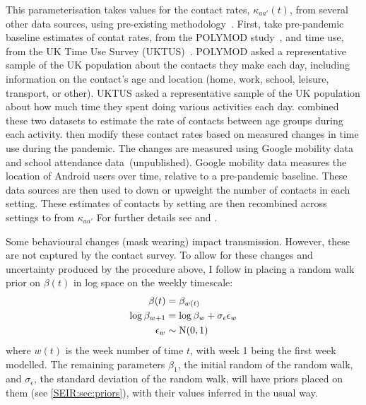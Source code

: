 \documentclass[thesis.tex]{subfiles}
\begin{document}
This parameterisation takes values for the contact rates, $\kappa_{aa'}(t)$, from several other data sources, using pre-existing methodology~\autocites{vanleeuwenTime}{vanleeuwenAugmenting}.
First, take pre-pandemic baseline estimates of contat rates, from the POLYMOD study~\autocite{mossongSocial}, and time use, from the UK Time Use Survey (UKTUS)~\autocite{UKTUS}.
POLYMOD asked a representative sample of the UK population about the contacts they make each day, including information on the contact's age and location (home, work, school, leisure, transport, or other).
UKTUS asked a representative sample of the UK population about how much time they spent doing various activities each day.
\Textcite{vanleeuwenAugmenting} combined these two datasets to estimate the rate of contacts between age groups during each activity.
\Textcite{birrellRealtime} then modify these contact rates based on measured changes in time use during the pandemic.
The changes are measured using Google mobility data~\autocite{googleCOVID19} and school attendance data~(unpublished).
Google mobility data measures the location of Android users over time, relative to a pre-pandemic baseline.
These data sources are then used to down or upweight the number of contacts in each setting.
These estimates of contacts by setting are then recombined across settings to from $\kappa_{aa'}$
For further details see \textcite{vanleeuwenAugmenting} and \textcite[supplementary material]{birrellRealtime}.

Some behavioural changes (\eg mask wearing) impact transmission.
However, these are not captured by the contact survey.
To allow for these changes and uncertainty produced by the procedure above, I follow \textcite{birrellRealtime} in placing a random walk prior on $\beta(t)$ in log space on the weekly timescale:
\begin{align}
    \beta(t) &= \beta_{w(t)} \\
    \log\beta_{w+1} &= \log\beta_w + \sigma_\epsilon \epsilon_w \\
    \epsilon_w &\sim \operatorname{N}(0, 1)
\end{align}
where $w(t)$ is the week number of time $t$, with week 1 being the first week modelled.
The remaining parameters $\beta_1$, the initial random of the random walk, and $\sigma_\epsilon$, the standard deviation of the random walk, will have priors placed on them (see \cref{SEIR:sec:priors}), with their values inferred in the usual way.
\end{document}
